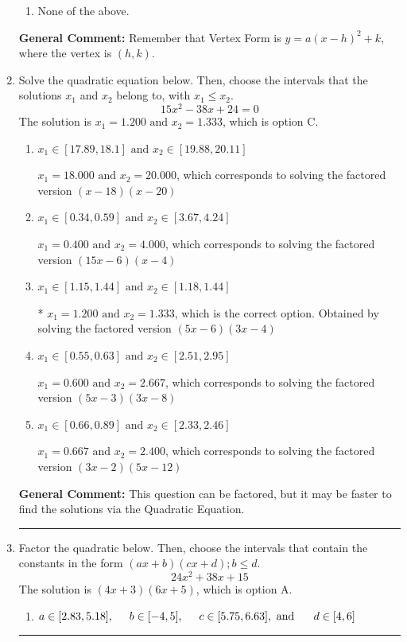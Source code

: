 \documentclass{extbook}[14pt]
\newcommand{\litem}[1]{\item #1

\rule{\textwidth}{0.4pt}}
\begin{document}
\begin{enumerate}
{\begin{enumerate}[label=\Alph*.]
\begin{multicols}{2}
\end{multicols}\item None of the above.\end{enumerate}
\textbf{General Comment:} Remember that Vertex Form is $y = a(x-h)^2+k$, where the vertex is $(h, k)$.
}
\litem{
Solve the quadratic equation below. Then, choose the intervals that the solutions $x_1$ and $x_2$ belong to, with $x_1 \leq x_2$.
\[ 15x^{2} -38 x + 24 = 0 \]The solution is \( x_1 = 1.200 \text{ and } x_2 = 1.333 \), which is option C.\begin{enumerate}[label=\Alph*.]
\item \( x_1 \in [17.89, 18.1] \text{ and } x_2 \in [19.88, 20.11] \)

$x_1 = 18.000 \text{ and } x_2 = 20.000$, which corresponds to solving the factored version $(x -18)(x -20)$
\item \( x_1 \in [0.34, 0.59] \text{ and } x_2 \in [3.67, 4.24] \)

$x_1 = 0.400 \text{ and } x_2 = 4.000$, which corresponds to solving the factored version $(15x -6)(x -4)$
\item \( x_1 \in [1.15, 1.44] \text{ and } x_2 \in [1.18, 1.44] \)

* $x_1 = 1.200 \text{ and } x_2 = 1.333$, which is the correct option. Obtained by solving the factored version $(5x -6)(3x -4)$
\item \( x_1 \in [0.55, 0.63] \text{ and } x_2 \in [2.51, 2.95] \)

$x_1 = 0.600 \text{ and } x_2 = 2.667$, which corresponds to solving the factored version $(5x -3)(3x -8)$
\item \( x_1 \in [0.66, 0.89] \text{ and } x_2 \in [2.33, 2.46] \)

$x_1 = 0.667 \text{ and } x_2 = 2.400$, which corresponds to solving the factored version $(3x -2)(5x -12)$
\end{enumerate}

\textbf{General Comment:} This question can be factored, but it may be faster to find the solutions via the Quadratic Equation.
}
\litem{
Factor the quadratic below. Then, choose the intervals that contain the constants in the form $(ax+b)(cx+d); b \leq d.$
\[ 24x^{2} +38 x + 15 \]The solution is \( (4x + 3)(6x + 5) \), which is option A.\begin{enumerate}[label=\Alph*.]
\item \( a \in [2.83, 5.18], \hspace*{5mm} b \in [-4, 5], \hspace*{5mm} c \in [5.75, 6.63], \text{ and } \hspace*{5mm} d \in [4, 6] \)


\end{enumerate}}
\end{enumerate}
\end{document}
